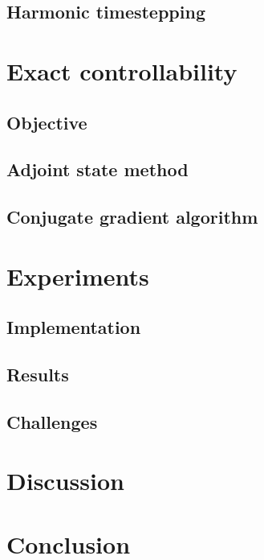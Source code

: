 \documentclass[utf8,english]{gradu3}
\begin{document}
\section{Harmonic timestepping}\label{sec:harmonic_timestep}



\chapter{Exact controllability}


\section{Objective}

\section{Adjoint state method}

\section{Conjugate gradient algorithm}



\chapter{Experiments}\label{cha:experiments}

\section{Implementation}

\section{Results}

\section{Challenges}




\chapter{Discussion}



\chapter{Conclusion}



\hfuzz=3.5pt
\printbibliography
\hfuzz=0pt
\end{document}
